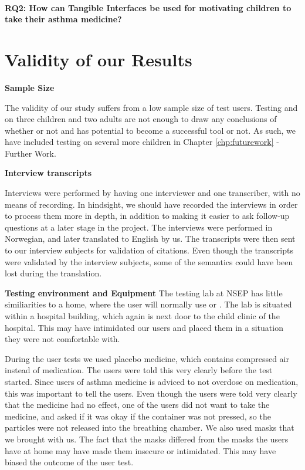\paragraph{RQ2: How can Tangible Interfaces be used for motivating children to take their asthma medicine?}


\section{Validity of our Results}
\label{sec:validity}

\textbf{Sample Size}

The validity of our study suffers from a low sample size of test users. Testing \ab{} and \app{} on three children and two adults are not enough to draw any conclusions of whether or not \app{} and \ab{} has potential to become a successful tool or not. As such, we have included testing on several more children in Chapter \ref{chp:futurework} - Further Work.    

\textbf{Interview transcripts}

Interviews were performed by having one interviewer and one transcriber, with no means of recording. In hindsight, we should have recorded the interviews in order to process them more in depth, in addition to making it easier to ask follow-up questions at a later stage in the project. The interviews were performed in Norwegian, and later translated to English by us. The transcripts were then sent to our interview subjects for validation of citations. Even though the transcripts were validated by the interview subjects, some of the semantics could have been lost during the translation. 


\textbf{Testing environment and Equipment}
The testing lab at NSEP has little similiarities to a home, where the user will normally use \ab{} or \app{}. The lab is situated within a hospital building, which again is next door to the child clinic of the hospital. This may have intimidated our users and placed them in a situation they were not comfortable with. 

During the user tests we used placebo medicine, which contains compressed air instead of medication. The users were told this very clearly before the test started. Since users of asthma medicine is adviced to not overdose on medication, this was important to tell the users. Even though the users were told very clearly that the medicine had no effect, one of the users did not want to take the medicine, and asked if it was okay if the container was not pressed, so the particles were not released into the breathing chamber. 
We also used masks that we brought with us. The fact that the masks differed from the masks the users have at home may have made them insecure or intimidated. This may have biased the outcome of the user test. 


